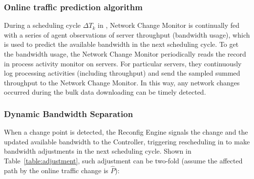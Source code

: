 {\subsubsection{Online traffic prediction algorithm}


During a scheduling cycle $\Delta T_k$ in \name, Network Change Monitor is continually fed with a series of agent observations of server throughput (bandwidth usage), which is used to predict the available bandwidth in the next scheduling cycle. To get the bandwidth usage, the Network Change Monitor periodically reads the record in process activity monitor on servers. For particular servers, they continuously log processing activities (including throughput) and send the sampled summed throughput to the Network Change Monitor. In this way, any network changes occurred during the bulk data downloading can be timely detected.


\subsubsection{Dynamic Bandwidth Separation}

When a change point is detected, the Reconfig Engine signals the change and the updated available bandwidth to the Controller, triggering rescheduling in \newname to make bandwidth adjustments in the next scheduling cycle. Shown in Table~\ref{table:adjustment}, such adjustment can be two-fold (assume the affected path by the online traffic change is $\hat{P}$):

\begin{table}[t]
\begin{center}
\end{center}
\caption{}
\label{table:adjustment}
\end{table}

}
